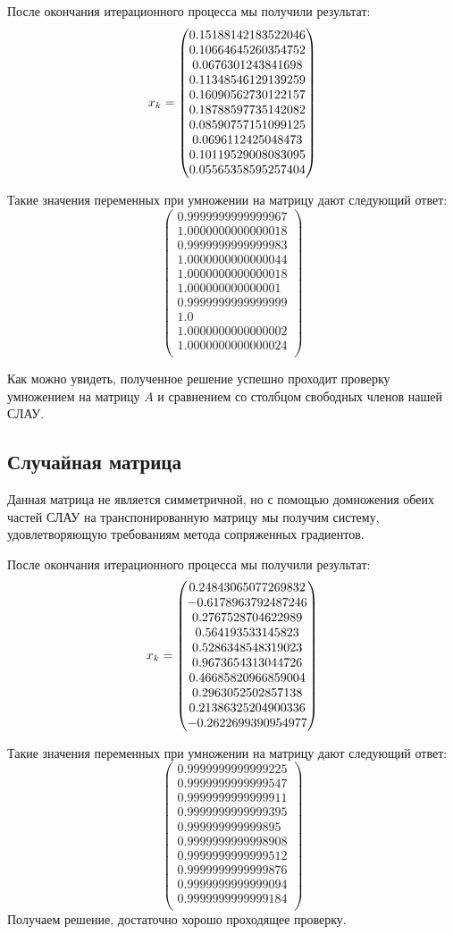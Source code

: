 \documentclass[../../report.tex]{subfiles}
\begin{document}
После окончания итерационного процесса мы получили результат:
\[
x_{k} = \begin{pmatrix} 0.15188142183522046 \\ 0.10664645260354752 \\ 0.0676301243841698 \\ 0.11348546129139259 \\ 0.16090562730122157 \\ 0.18788597735142082 \\ 0.08590757151099125 \\ 0.0696112425048473 \\ 0.10119529008083095 \\ 0.05565358595257404 \\ \end{pmatrix}
\]

Такие значения переменных при умножении на матрицу дают следующий ответ:
\[
\begin{pmatrix}
    0.9999999999999967 \\
    1.0000000000000018 \\
    0.9999999999999983 \\
    1.0000000000000044 \\
    1.0000000000000018 \\
    1.000000000000001 \\
    0.9999999999999999 \\
    1.0 \\
    1.0000000000000002 \\
    1.0000000000000024 \\
\end{pmatrix}
\]

Как можно увидеть, полученное решение успешно проходит проверку умножением на матрицу $A$
и сравнением со столбцом свободных членов нашей СЛАУ.

\subsection{Случайная матрица}
Данная матрица не является симметричной, но с помощью домножения обеих частей СЛАУ на транспонированную матрицу
мы получим систему, удовлетворяющую требованиям метода сопряженных градиентов.

После окончания итерационного процесса мы получили результат:
\[
x_{k} = \begin{pmatrix} 0.24843065077269832 \\ -0.6178963792487246 \\ 0.2767528704622989 \\ 0.564193533145823 \\ 0.5286348548319023 \\ 0.9673654313044726 \\ 0.46685820966859004 \\ 0.2963052502857138 \\ 0.21386325204900336 \\ -0.2622699390954977 \\ \end{pmatrix}
\]

Такие значения переменных при умножении на матрицу дают следующий ответ:
\[
\begin{pmatrix}
    0.9999999999999225 \\
    0.9999999999999547 \\
    0.9999999999999911 \\
    0.9999999999999395 \\
    0.999999999999895 \\
    0.9999999999998908 \\
    0.9999999999999512 \\
    0.9999999999999876 \\
    0.9999999999999094 \\
    0.9999999999999184 \\
\end{pmatrix}
\]
Получаем решение, достаточно хорошо проходящее проверку.
\end{document}
